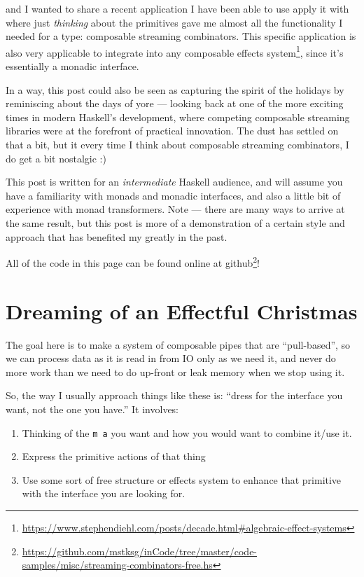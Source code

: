 \documentclass[]{article}
\renewcommand{\href}[2]{#2\footnote{\url{#1}}}
\begin{document}
and I wanted to share a recent application I have been able to use apply it with
where just \emph{thinking} about the primitives gave me almost all the
functionality I needed for a type: composable streaming combinators. This
specific application is also very applicable to integrate into any
\href{https://www.stephendiehl.com/posts/decade.html\#algebraic-effect-systems}{composable
effects system}, since it's essentially a monadic interface.

In a way, this post could also be seen as capturing the spirit of the holidays
by reminiscing about the days of yore --- looking back at one of the more
exciting times in modern Haskell's development, where competing composable
streaming libraries were at the forefront of practical innovation. The dust has
settled on that a bit, but it every time I think about composable streaming
combinators, I do get a bit nostalgic :)

This post is written for an \emph{intermediate} Haskell audience, and will
assume you have a familiarity with monads and monadic interfaces, and also a
little bit of experience with monad transformers. Note --- there are many ways
to arrive at the same result, but this post is more of a demonstration of a
certain style and approach that has benefited my greatly in the past.

All of the code in this page
\href{https://github.com/mstksg/inCode/tree/master/code-samples/misc/streaming-combinators-free.hs}{can
be found online at github}!

\section{Dreaming of an Effectful
Christmas}\label{dreaming-of-an-effectful-christmas}

The goal here is to make a system of composable pipes that are ``pull-based'',
so we can process data as it is read in from IO only as we need it, and never do
more work than we need to do up-front or leak memory when we stop using it.

So, the way I usually approach things like these is: ``dress for the interface
you want, not the one you have.'' It involves:

\begin{enumerate}
\def\labelenumi{\arabic{enumi}.}
\tightlist
\item
  Thinking of the \texttt{m\ a} you want and how you would want to combine
  it/use it.
\item
  Express the primitive actions of that thing
\item
  Use some sort of free structure or effects system to enhance that primitive
  with the interface you are looking for.
\end{enumerate}
\end{document}
